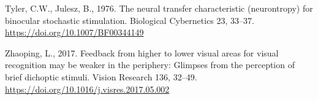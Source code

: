 \documentclass[
  12pt,
]{article}
\newlength{\cslhangindent}
\newenvironment{CSLReferences}[2] %
 {\begin{list}{}{%
  \setlength{\itemindent}{0pt}
  \setlength{\leftmargin}{0pt}
  \setlength{\parsep}{0pt}
  \ifodd #1
   \setlength{\leftmargin}{\cslhangindent}
   \setlength{\itemindent}{-1\cslhangindent}
  \fi
  \setlength{\itemsep}{#2\baselineskip}}}
 {\end{list}}
\begin{document}
\begin{CSLReferences}{1}{0}
Tyler, C.W., Julesz, B., 1976. The neural transfer characteristic
(neurontropy) for binocular stochastic stimulation. Biological
Cybernetics 23, 33--37. \url{https://doi.org/10.1007/BF00344149}

Zhaoping, L., 2017. Feedback from higher to lower visual areas for
visual recognition may be weaker in the periphery: Glimpses from the
perception of brief dichoptic stimuli. Vision Research 136, 32--49.
\url{https://doi.org/10.1016/j.visres.2017.05.002}

\end{CSLReferences}
\end{document}
